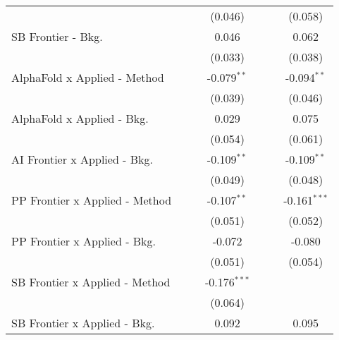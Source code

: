 \begin{tabular}{lcccccc}
                                  &              &                & (0.046)        &         &                & (0.058)\\   
   SB Frontier - Bkg.             &              &                & 0.046          &         &                & 0.062\\   
                                  &              &                & (0.033)        &         &                & (0.038)\\   
   AlphaFold x Applied - Method   &              &                & -0.079$^{**}$  &         &                & -0.094$^{**}$\\   
                                  &              &                & (0.039)        &         &                & (0.046)\\   
   AlphaFold x Applied - Bkg.     &              &                & 0.029          &         &                & 0.075\\   
                                  &              &                & (0.054)        &         &                & (0.061)\\   
   AI Frontier x Applied - Bkg.   &              &                & -0.109$^{**}$  &         &                & -0.109$^{**}$\\   
                                  &              &                & (0.049)        &         &                & (0.048)\\   
   PP Frontier x Applied - Method &              &                & -0.107$^{**}$  &         &                & -0.161$^{***}$\\   
                                  &              &                & (0.051)        &         &                & (0.052)\\   
   PP Frontier x Applied - Bkg.   &              &                & -0.072         &         &                & -0.080\\   
                                  &              &                & (0.051)        &         &                & (0.054)\\   
   SB Frontier x Applied - Method &              &                & -0.176$^{***}$ &         &                &   \\   
                                  &              &                & (0.064)        &         &                &   \\   
   SB Frontier x Applied - Bkg.   &              &                & 0.092          &         &                & 0.095\\   

\end{tabular}
